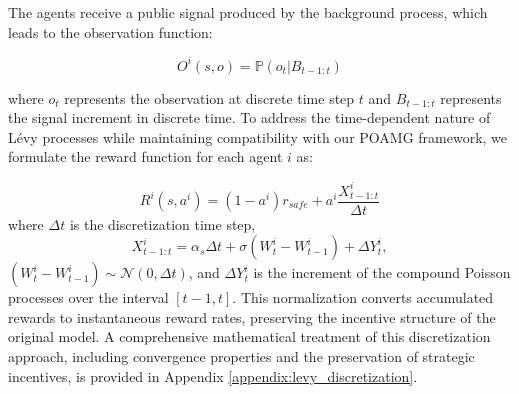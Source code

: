 The agents receive a public signal produced by the background process, which leads to the observation function:

\begin{equation}
    O^i(s, o) = \mathbb{P}(o_t | B_{t-1:t})
\end{equation}

where $o_t$ represents the observation at discrete time step $t$ and $B_{t-1:t}$ represents the signal increment in discrete time. To address the time-dependent nature of Lévy processes while maintaining compatibility with our POAMG framework, we formulate the reward function for each agent $i$ as:

\begin{equation}
    R^i(s, a^i) = (1-a^i)r_\textit{safe} + a^i \frac{X^i_{t-1:t}}{\Delta t}
\end{equation}
where $\Delta t$ is the discretization time step,
\begin{equation}
    X^i_{t-1:t} = \alpha_s \Delta t + \sigma (W^i_t - W^i_{t-1}) + \Delta Y^i_t,
\end{equation}
$(W^i_t - W^i_{t-1}) \sim \mathcal{N}(0, \Delta t)$, and $\Delta Y^i_t$ is the increment of the compound Poisson processes over the interval $[t-1, t]$.
This normalization converts accumulated rewards to instantaneous reward rates, preserving the incentive structure of the original model. A comprehensive mathematical treatment of this discretization approach, including convergence properties and the preservation of strategic incentives, is provided in Appendix \ref{appendix:levy_discretization}.

